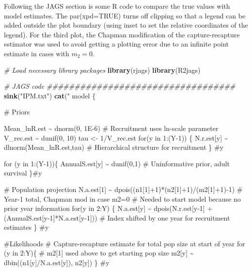 \documentclass[
]{krantz}
\makeatletter
\newenvironment{Shaded}{\begin{snugshade}}{\end{snugshade}}
\newcommand{\CommentTok}[1]{\textcolor[rgb]{0.37,0.37,0.37}{\textit{#1}}}
\newcommand{\FunctionTok}[1]{\textcolor[rgb]{0.27,0.27,0.27}{\textbf{#1}}}
\newcommand{\NormalTok}[1]{#1}
\newcommand{\StringTok}[1]{\textcolor[rgb]{0.5,0.5,0.5}{#1}}
\newenvironment{kframe}{%
\medskip{}
\setlength{\fboxsep}{.8em}
 \def\at@end@of@kframe{}%
 \ifinner\ifhmode%
  \def\at@end@of@kframe{\end{minipage}}%
  \begin{minipage}{\columnwidth}%
 \fi\fi%
 \def\FrameCommand##1{\hskip\@totalleftmargin \hskip-\fboxsep
 \colorbox{shadecolor}{##1}\hskip-\fboxsep
     \hskip-\linewidth \hskip-\@totalleftmargin \hskip\columnwidth}%
 \MakeFramed {\advance\hsize-\width
   \@totalleftmargin\z@ \linewidth\hsize
   \@setminipage}}%
 {\par\unskip\endMakeFramed%
 \at@end@of@kframe}
\renewenvironment{Shaded}{\begin{kframe}}{\end{kframe}}
\makeatother
\begin{document}
Following the JAGS section is some R code to compare the true values with model estimates. The par(xpd=TRUE) turns off clipping so that a legend can be added outside the plot boundary (using inset to set the relative coordinates of the legend). For the third plot, the Chapman modification of the capture-recapture estimator \citep{ricker1975} was used to avoid getting a plotting error due to an infinite point estimate in cases with \(m_2=0\).

\begin{Shaded}
\begin{Highlighting}[]
\CommentTok{\# Load necessary library packages}
\FunctionTok{library}\NormalTok{(rjags)}
\FunctionTok{library}\NormalTok{(R2jags)}

\CommentTok{\# JAGS code \#\#\#\#\#\#\#\#\#\#\#\#\#\#\#\#\#\#\#\#\#\#\#\#\#\#\#\#\#\#\#\#\#\#}
\FunctionTok{sink}\NormalTok{(}\StringTok{"IPM.txt"}\NormalTok{)}
\FunctionTok{cat}\NormalTok{(}\StringTok{"}
\StringTok{model \{}

\StringTok{\# Priors}

\StringTok{ Mean\_lnR.est \textasciitilde{} dnorm(0, 1E{-}6)  \# Recruitment uses ln{-}scale parameter}
\StringTok{ V\_rec.est \textasciitilde{} dunif(0, 10)}
\StringTok{ tau \textless{}{-} 1/V\_rec.est}
\StringTok{ for(y in 1:(Y{-}1)) \{}
\StringTok{    N.r.est[y] \textasciitilde{} dlnorm(Mean\_lnR.est,tau)}
\StringTok{     \# Hierarchical structure for recruitment}
\StringTok{  \} \#y}

\StringTok{for (y in 1:(Y{-}1))\{}
\StringTok{  AnnualS.est[y] \textasciitilde{} dunif(0,1)  \# Uninformative prior, adult survival}
\StringTok{\}\#y}

\StringTok{\# Population projection}
\StringTok{ N.a.est[1] \textasciitilde{} dpois((n1[1]+1)*(n2[1]+1)/(m2[1]+1){-}1) }
\StringTok{  \# Year{-}1 total, Chapman mod in case m2=0}
\StringTok{  \# Needed to start model because no prior year information}
\StringTok{ for(y in 2:Y) \{}
\StringTok{     N.a.est[y] \textasciitilde{} dpois(N.r.est[y{-}1] + (AnnualS.est[y{-}1]*N.a.est[y{-}1]))}
\StringTok{     \# Index shifted by one year for recruitment estimates}
\StringTok{     \} \#y}

\StringTok{\#Likelihoods}
\StringTok{\# Capture{-}recapture estimate for total pop size at start of year}
\StringTok{  for (y in 2:Y)\{  \# m2[1] used above to get starting pop size}
\StringTok{    m2[y] \textasciitilde{} dbin((n1[y]/N.a.est[y]), n2[y])}
\StringTok{    \} \#y}


\end{Highlighting}
\end{Shaded}
\end{document}
